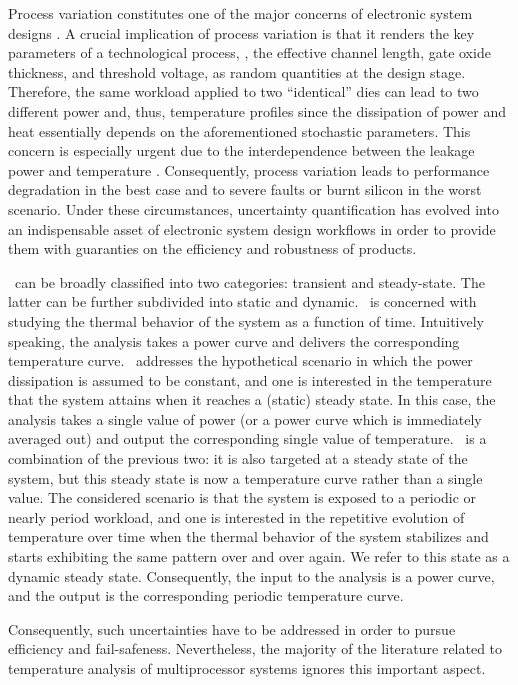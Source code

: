 Process variation constitutes one of the major concerns of electronic system designs \cite{srivastava2010}.
A crucial implication of process variation is that it renders the key parameters of a technological process, \eg, the effective channel length, gate oxide thickness, and threshold voltage, as random quantities at the design stage.
Therefore, the same workload applied to two ``identical'' dies can lead to two different power and, thus, temperature profiles since the dissipation of power and heat essentially depends on the aforementioned stochastic parameters.
This concern is especially urgent due to the interdependence between the leakage power and temperature \cite{liu2007}.
Consequently, process variation leads to performance degradation in the best case and to severe faults or burnt silicon in the worst scenario.
Under these circumstances, uncertainty quantification \cite{maitre2010} has evolved into an indispensable asset of electronic system design workflows in order to provide them with guaranties on the efficiency and robustness of products.

\Ta\ can be broadly classified into two categories: transient and steady-state.
The latter can be further subdivided into static and dynamic.
\Tta\ is concerned with studying the thermal behavior of the system as a function of time.
Intuitively speaking, the analysis takes a power curve and delivers the corresponding temperature curve.
\Sssta\ addresses the hypothetical scenario in which the power dissipation is assumed to be constant, and one is interested in the temperature that the system attains when it reaches a (static) steady state.
In this case, the analysis takes a single value of power (or a power curve which is immediately averaged out) and output the corresponding single value of temperature.
\Dssta\ is a combination of the previous two: it is also targeted at a steady state of the system, but this steady state is now a temperature curve rather than a single value.
The considered scenario is that the system is exposed to a periodic or nearly period workload, and one is interested in the repetitive evolution of temperature over time when the thermal behavior of the system stabilizes and starts exhibiting the same pattern over and over again.
We refer to this state as a dynamic steady state.
Consequently, the input to the analysis is a power curve, and the output is the corresponding periodic temperature curve.

Consequently, such uncertainties have to be addressed in order to pursue efficiency and fail-safeness.
Nevertheless, the majority of the literature related to temperature analysis of multiprocessor systems ignores this important aspect.

